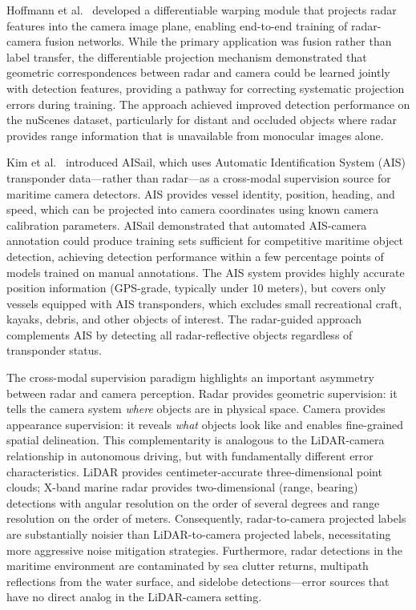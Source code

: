 Hoffmann et al.~\cite{hoffmann2020warping} developed a differentiable warping module that projects radar features into the camera image plane, enabling end-to-end training of radar-camera fusion networks. While the primary application was fusion rather than label transfer, the differentiable projection mechanism demonstrated that geometric correspondences between radar and camera could be learned jointly with detection features, providing a pathway for correcting systematic projection errors during training. The approach achieved improved detection performance on the nuScenes dataset, particularly for distant and occluded objects where radar provides range information that is unavailable from monocular images alone.

Kim et al.~\cite{kim2024sailing} introduced AISail, which uses Automatic Identification System (AIS) transponder data---rather than radar---as a cross-modal supervision source for maritime camera detectors. AIS provides vessel identity, position, heading, and speed, which can be projected into camera coordinates using known camera calibration parameters. AISail demonstrated that automated AIS-camera annotation could produce training sets sufficient for competitive maritime object detection, achieving detection performance within a few percentage points of models trained on manual annotations. The AIS system provides highly accurate position information (GPS-grade, typically under 10 meters), but covers only vessels equipped with AIS transponders, which excludes small recreational craft, kayaks, debris, and other objects of interest. The radar-guided approach complements AIS by detecting all radar-reflective objects regardless of transponder status.

The cross-modal supervision paradigm highlights an important asymmetry between radar and camera perception. Radar provides geometric supervision: it tells the camera system \emph{where} objects are in physical space. Camera provides appearance supervision: it reveals \emph{what} objects look like and enables fine-grained spatial delineation. This complementarity is analogous to the LiDAR-camera relationship in autonomous driving, but with fundamentally different error characteristics. LiDAR provides centimeter-accurate three-dimensional point clouds; X-band marine radar provides two-dimensional (range, bearing) detections with angular resolution on the order of several degrees and range resolution on the order of meters. Consequently, radar-to-camera projected labels are substantially noisier than LiDAR-to-camera projected labels, necessitating more aggressive noise mitigation strategies. Furthermore, radar detections in the maritime environment are contaminated by sea clutter returns, multipath reflections from the water surface, and sidelobe detections---error sources that have no direct analog in the LiDAR-camera setting.

